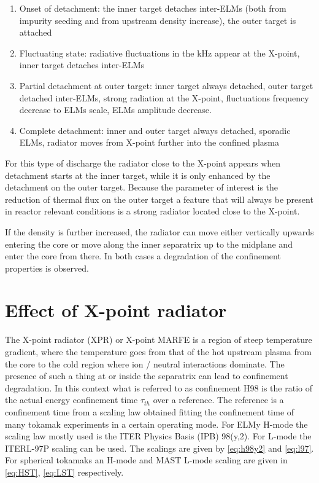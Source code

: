 \begin{enumerate}
    \item Onset of detachment: the inner target detaches inter-ELMs (both from impurity seeding and from upstream density increase), the outer target is attached
    \item Fluctuating state: radiative fluctuations in the kHz appear at the X-point, inner target detaches inter-ELMs
    \item Partial detachment at outer target: inner target always detached, outer target detached inter-ELMs, strong radiation at the X-point, fluctuations frequency decrease to ELMs scale, ELMs amplitude decrease.
    \item Complete detachment: inner and outer target always detached, sporadic ELMs, radiator moves from X-point further into the confined plasma
\end{enumerate}

For this type of discharge the radiator close to the X-point appears when detachment starts at the inner target, while it is only enhanced by the detachment on the outer target. Because the parameter of interest is the reduction of thermal flux on the outer target a feature that will always be present in reactor relevant conditions is a strong radiator located close to the X-point.

If the density is further increased, the radiator can move either vertically upwards entering the core\cite{Bernert2021} or move along the inner separatrix up to the midplane and enter the core from there.\cite{Lipschultz1984} In both cases a degradation of the confinement properties is observed.

\section{Effect of X-point radiator}\label{Effect of X-point radiator}


The X-point radiator (XPR)\cite{Bernert2021} or X-point MARFE\cite{Kallenbach2015a} is a region of steep temperature gradient, where the temperature goes from that of the hot upstream plasma from the core to the cold region where ion / neutral interactions dominate. The presence of such a thing at or inside the separatrix can lead to confinement degradation. In this context what is referred to as confinement H98 is the ratio of the actual energy confinement time $\tau_{th}$ over a reference. The reference is a confinement time from a scaling law obtained fitting the confinement time of many tokamak experiments in a certain operating mode. For ELMy H-mode the scaling law mostly used is the ITER Physics Basis (IPB) 98(y,2).\cite{Doyle2007} For L-mode the ITERL-97P scaling can be used. \cite{Kaye1997} The scalings are given by \autoref{eq:h98y2} and \ref{eq:l97}. For spherical tokamaks an H-mode \cite{Kaye2006} and MAST L-mode \cite{Kaye2021} scaling are given in \autoref{eq:HST}, \ref{eq:LST} respectively.


